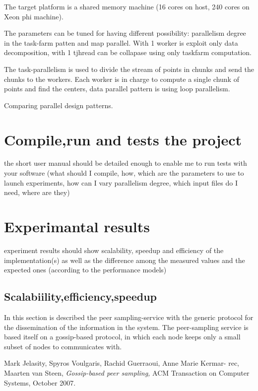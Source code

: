\documentclass[12pt]{article}
\begin{document}
The target platform is a shared memory machine (16 cores on host, 240 cores on Xeon phi machine).

The parameters can be tuned for having different possibility:  parallelism degree in the task-farm patten and map parallel. With 1 worker is exploit only data decomposition, with 1 tjhread can be collapase using only taskfarm computation.


The task-parallelism is used to divide the stream of points in chunks and send the chunks to the workers. 
Each worker is in charge to compute a single chunk of points and find the centers, data parallel pattern is using loop parallelism.


Comparing parallel design patterns.



\section{Compile,run and tests the project}
the short user manual should be detailed enough to enable me to run tests with your software (what should I compile, how, which are the parameters to use to launch experiments, how can I vary parallelism degree, which input files do I need, where are they)

\section{Experimantal results}
experiment results should show scalability, speedup and efficiency of the implementation(s) as well as the difference among the measured values and the expected ones (according to the performance models)

\subsection{Scalabiility,efficiency,speedup }


In this section is described the peer sampling-service with the generic protocol for the dissemination of the information in the system. The peer-sampling service is based itself on a gossip-based protocol, in which each node keeps only a small subset of nodes to communicates with.






\begin{thebibliography}{9}

\item
Mark Jelasity, Spyros Voulgaris, Rachid Guerraoui, Anne Marie Kermar-
rec, Maarten van Steen, \emph{Gossip-based peer sampling,} ACM Transaction on
Computer Systems, October 2007.
\end{thebibliography}
\end{document}
